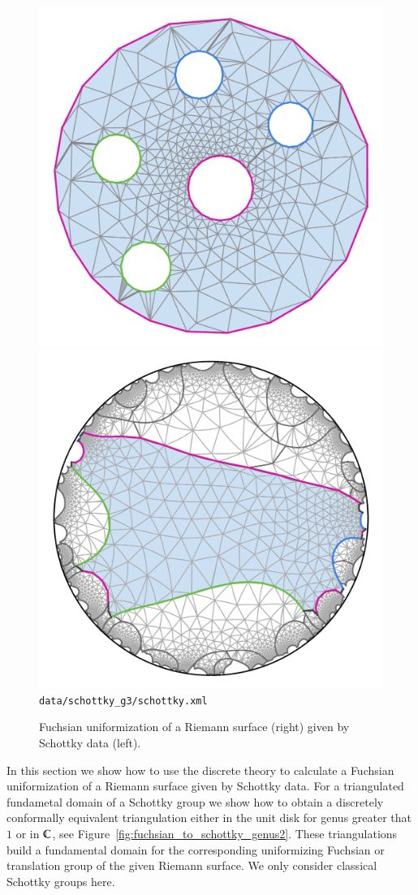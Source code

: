 \documentclass[Thesis.tex]{subfiles}
\begin{document}
\begin{figure}
	\centering
	\includegraphics[width=0.45\linewidth]{data/schottky_g3/genus3_image2}
	\includegraphics[width=0.45\linewidth]{data/schottky_g3/genus3_domain2}
	{\scriptsize\tt data/schottky\_g3/schottky.xml}
	\caption{Fuchsian uniformization of a Riemann surface (right) given by Schottky data (left).}
	\label{fig:fuchsian_to_schottky_genus3}
\end{figure}

In this section we show how to use the discrete theory to calculate a Fuchsian uniformization of a Riemann surface 
given by Schottky data. For a triangulated fundametal domain of a Schottky group we show how to obtain a discretely
conformally equivalent triangulation either in the unit disk for genus greater that $1$ or in $\mathbb C$, see Figure~\ref{fig:fuchsian_to_schottky_genus2}. These triangulations build
a fundamental domain for the corresponding uniformizing Fuchsian or translation group of the given Riemann surface. We only consider classical Schottky groups here.
\end{document}
